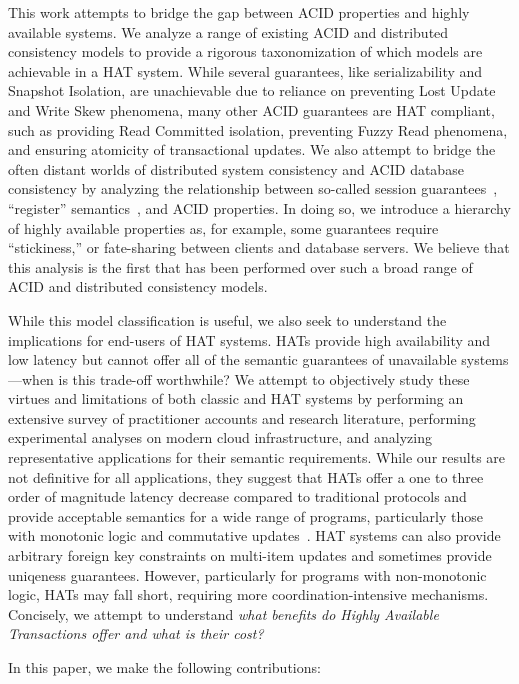 This work attempts to bridge the gap between ACID properties and
highly available systems. We analyze a range of existing ACID and
distributed consistency models to provide a rigorous taxonomization of
which models are achievable in a HAT system.  While several
guarantees, like serializability and Snapshot Isolation, are
unachievable due to reliance on preventing Lost Update and Write Skew
phenomena, many other ACID guarantees are HAT compliant, such as
providing Read Committed isolation, preventing Fuzzy Read phenomena,
and ensuring atomicity of transactional updates. We also attempt to
bridge the often distant worlds of distributed system consistency and
ACID database consistency by analyzing the relationship between
so-called session guarantees~\cite{sessionguarantees}, ``register''
semantics~\cite{herlihy-art}, and ACID properties. In doing so, we
introduce a hierarchy of highly available properties as, for example,
some guarantees require ``stickiness,'' or fate-sharing between
clients and database servers. We believe that this analysis is the
first that has been performed over such a broad range of ACID and
distributed consistency models.

While this model classification is useful, we also seek to understand
the implications for end-users of HAT systems. HATs provide high
availability and low latency but cannot offer all of the semantic
guarantees of unavailable systems---when is this trade-off worthwhile?
We attempt to objectively study these virtues and limitations of both
classic and HAT systems by performing an extensive survey of
practitioner accounts and research literature, performing experimental
analyses on modern cloud infrastructure, and analyzing representative
applications for their semantic requirements. While our results are
not definitive for all applications, they suggest that HATs offer a
one to three order of magnitude latency decrease compared to
traditional protocols and provide acceptable semantics for a wide
range of programs, particularly those with monotonic logic and
commutative updates~\cite{calm, blooml, crdt}. HAT systems can also provide
arbitrary foreign key constraints on multi-item updates and sometimes
provide uniqeness guarantees. However, particularly for programs with
non-monotonic logic, HATs may fall short, requiring more
coordination-intensive mechanisms. Concisely, we attempt to understand
\textit{what benefits do Highly Available Transactions offer and what
  is their cost?}

In this paper, we make the following contributions:

